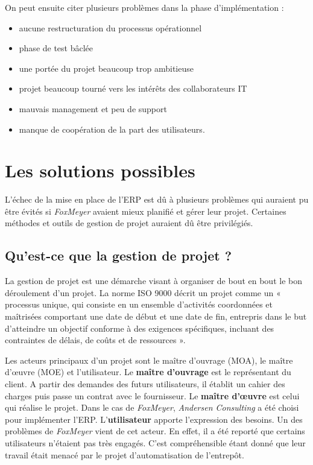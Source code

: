 \documentclass[12pt]{report}
\begin{document}
On peut ensuite citer plusieurs problèmes dans la phase d’implémentation :
\begin{itemize}
\item aucune restructuration du processus opérationnel
\item phase de test bâclée
\item une portée du projet beaucoup trop ambitieuse
\item projet beaucoup tourné vers les intérêts des collaborateurs IT
\item mauvais management et peu de support
\item manque de coopération de la part des utilisateurs\cite{zimmerfoxmeyer}.
\end{itemize}

\section{Les solutions possibles}

L'échec de la mise en place de l'ERP est dû à plusieurs problèmes qui auraient pu être évités si \textit{FoxMeyer} avaient mieux planifié et gérer leur projet. Certaines méthodes et outils de gestion de projet auraient dû être privilégiés.

\subsection{Qu'est-ce que la gestion de projet ?}

La gestion de projet est une démarche visant à organiser de bout en bout le bon déroulement d'un projet.
La norme ISO 9000 décrit un projet comme un « processus unique, qui consiste en un ensemble d'activités coordonnées et maîtrisées comportant une date de début et une date de fin, entrepris dans le but d'atteindre un objectif conforme à des 
exigences spécifiques, incluant des contraintes de délais, de coûts et de ressources »\cite{wikigestion}.

Les acteurs principaux d'un projet sont le maître d'ouvrage (MOA), le maître d’œuvre (MOE) et l'utilisateur.
Le \textbf{maître d'ouvrage} est le représentant du client. A partir des demandes des futurs utilisateurs, il établit un cahier des charges puis passe un contrat avec le fournisseur.
Le \textbf{maître d’œuvre} est celui qui réalise le projet. Dans le cas de \textit{FoxMeyer}, \textit{Andersen Consulting} a été choisi pour implémenter l'ERP.
L'\textbf{utilisateur} apporte l'expression des besoins. Un des problèmes de \textit{FoxMeyer} vient de cet acteur. En effet, il a été reporté que certains utilisateurs n'étaient pas très engagés. C'est compréhensible étant donné que leur travail était menacé par le projet d'automatisation de l'entrepôt\cite{zimmerfoxmeyer}.
\end{document}
